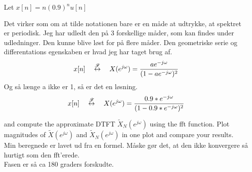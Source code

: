 \begin{Opgaver}
\begin{kapitel}
\begin{Opgave}
        \end{Opgave}
        \begin{Opgave}
            Let $x[n] = n(0.9)^nu[n]$
            \begin{UnderOpgave}
                Det virker som om at tilde notationen bare er en måde at udtrykke, at spektret er periodisk. 
                Jeg har udledt den på 3 forskellige måder, som kan findes under udledninger. 
                Den kunne blive løst for på flere måder. Den geometriske serie og differentations egenskaben er hvad jeg har taget brug af. 
                \[x[n] \transformation{F} X(e^{j\omega}) = \frac{ae^{-j\omega}}{(1 - ae^{-j\omega})^2}\]
                Og så længe a ikke er 1, så er det en løsning.
                \[x[n] \transformation{F} X(e^{j\omega}) = \frac{0.9*e^{-j\omega}}{(1 - 0.9*e^{-j\omega})^2}\]
            \end{UnderOpgave}

            \begin{UnderOpgave}[Choose first N = 20 samples of \text{$x[n]$}]
                and compute the approximate DTFT $\tilde{X}_N(e^{j\omega})$ using the fft function. 
                Plot magnitudes of $\tilde{X}(e^{j\omega})$ and $\tilde{X}_N(e^{j\omega})$ in one plot and
                compare your results.\\
                Min beregnede er lavet ud fra en formel. Måske gør det, at den ikke konvergere så hurtigt som den fft'erede. \\
                Fasen er så ca 180 graders forskudte. 

            \end{UnderOpgave}
            
            \begin{UnderOpgave}[Repeat part (b) using N = 50.]
                \vspace{60pt}
            \end{UnderOpgave}


\end{Opgave}
\end{kapitel}
\end{Opgaver}
